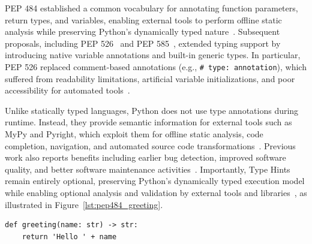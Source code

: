 PEP 484 established a common vocabulary for annotating function parameters, return types, and variables, enabling external tools to perform offline static analysis while preserving Python's dynamically typed nature~\cite{pep484}. Subsequent proposals, including PEP 526~\cite{pep526} and PEP 585~\cite{pep585}, extended typing support by introducing native variable annotations and built-in generic types. In particular, PEP 526 replaced comment-based annotations (e.g., \texttt{\# type: annotation}), which suffered from readability limitations, artificial variable initializations, and poor accessibility for automated tools~\cite{pep526}.

Unlike statically typed languages, Python does not use type annotations during runtime. Instead, they provide semantic information for external tools such as MyPy and Pyright, which exploit them for offline static analysis, code completion, navigation, and automated source code transformations~\cite{pep484}. Previous work also reports benefits including earlier bug detection, improved software quality, and better software maintenance activities~\cite{10.1145/3426422.3426981}. Importantly, Type Hints remain entirely optional, preserving Python's dynamically typed execution model while enabling optional analysis and validation by external tools and libraries~\cite{pep484,pep526}, as illustrated in Figure~\ref{lst:pep484_greeting}.

\begin{listing}[h]
\caption{Example of a function with Type Hints in Python (PEP 484~\cite{pep484}).}
\label{lst:pep484_greeting}

\begin{verbatim}
def greeting(name: str) -> str:
    return 'Hello ' + name
\end{verbatim}
\end{listing}


